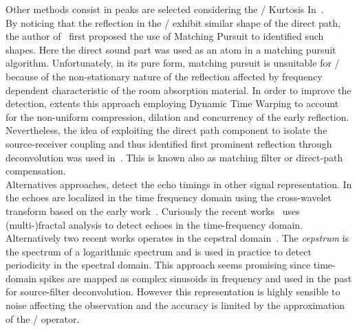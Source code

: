 Other methods consist in peaks are selected considering the \RIR/ Kurtosis In~.
\\By noticing that the reflection in the \RIRs/ exhibit similar shape of the direct path, the author of~ first proposed the use of Matching Pursuit to identified such shapes.
Here the direct sound part was used as an atom in a matching pursuit algorithm.
Unfortunately, in its pure form, matching pursuit is unsuitable for \RIRs/ because of the non-stationary nature of the reflection affected by frequency dependent characteristic of the room absorption material.
In order to improve the detection,  extents this approach employing Dynamic Time Warping to account for the non-uniform compression, dilation and concurrency of the early reflection.
Nevertheless, the idea of exploiting the direct path component to isolate the source-receiver coupling and thus identified first prominent reflection through deconvolution was used in~.
This is known also as matching filter or direct-path compensation.
\\Alternatives approaches, detect the echo timings in other signal representation.
In   the echoes are localized in the time frequency domain using the cross-wavelet transform based on the early work~.
Curiously the recent works~ uses (multi-)fractal analysis to detect echoes in the time-frequency domain.
Alternatively two recent works operates in the cepstral domain~.
The \textit{cepstrum} is the spectrum of a logarithmic spectrum and is used in practice to detect periodicity in the spectral domain.
This approach seems promising since time-domain spikes are mapped as complex sinusoids in frequency and used in the past for source-filter deconvolution.
However this representation is highly sensible to noise affecting the observation and the accuracy is limited by the approximation of the \DFT/ operator.

